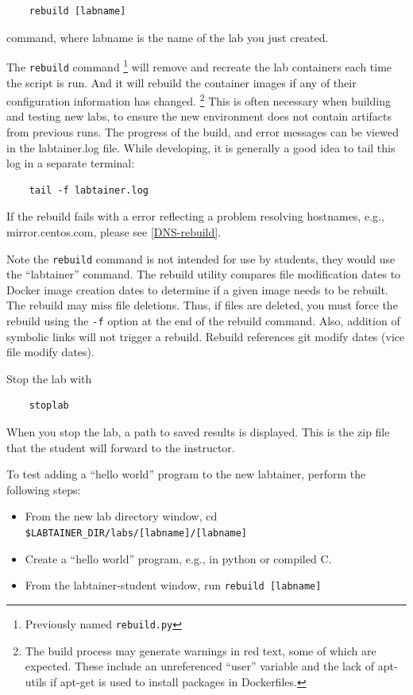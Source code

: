 \documentclass[12pt]{article}
\begin{document}
\begin{verbatim}
    rebuild [labname] 
\end{verbatim}
command, where labname is the name of the lab you just created.  

The {\tt rebuild} command \footnote{Previously named {\tt rebuild.py}} will remove and recreate the lab containers
each time the script is run.  And it will rebuild the container images if any of their configuration 
information has changed.  \footnote{The build process may generate warnings in red text, some of which are expected.  
These include an unreferenced ``user'' variable and the lack of apt-utils if apt-get is used to install packages in 
Dockerfiles.}  This is often necessary when building and testing new labs, to ensure the
new environment does not contain artifacts from previous runs.
The progress of the build, and error messages can be viewed in 
the labtainer.log file.  While developing, it is generally a good idea to tail this log in
a separate terminal:
\begin{verbatim}
    tail -f labtainer.log
\end{verbatim}
If the rebuild fails with a error reflecting a problem resolving hostnames, e.g., mirror.centos.com, please see \ref{DNS-rebuild}.

Note the {\tt rebuild} command is not intended for use by students, they would use the ``labtainer'' command.  
The rebuild utility compares file modification dates to Docker image creation dates to determine if
a given image needs to be rebuilt.  The rebuild may miss file deletions.  Thus, if files are deleted, you must
force the rebuild using the {\tt -f} option at the end of the rebuild command. Also, addition of symbolic links will not
trigger a rebuild.  Rebuild references git modify dates (vice file modify dates).

Stop the lab with 
\begin{verbatim}
    stoplab
\end{verbatim}
When you stop the lab, a path to saved results is displayed.
This is the zip file that the student will forward to the instructor.

To test adding a ``hello world'' program to the new labtainer, perform the following steps:
\begin{itemize}
\item From the new lab directory window, cd \verb!$LABTAINER_DIR/labs/[labname]/[labname]!
\item Create a ``hello world'' program, e.g., in python or compiled C.
\item From the labtainer-student window, run {\tt rebuild [labname]}
\end{itemize}
    
\end{document}
